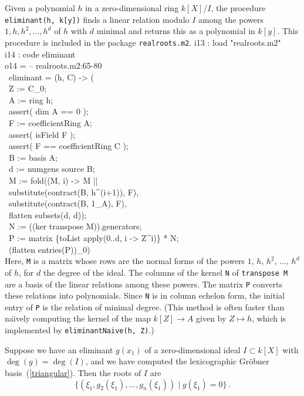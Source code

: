 Given a polynomial $h$ in a zero-dimensional ring $k[X]/I$, the
procedure {\tt eliminant(h, k[y])} finds a linear relation modulo $I$ 
among the powers $1, h, h^2, \ldots, h^d$ of $h$ with $d$ minimal
and returns this as a polynomial in $k[y]$.
This procedure is included in the \Mtwo{}\/ package 
{\tt realroots.m2}.
%
\beginOutput
i13 : load "realroots.m2"\\
\endOutput
%
\beginOutput
i14 : code eliminant\\
\emptyLine
o14 = -- realroots.m2:65-80\\
\      eliminant = (h, C) -> (\\
\           Z := C_0;\\
\           A := ring h;\\
\           assert( dim A == 0 );\\
\           F := coefficientRing A;\\
\           assert( isField F );\\
\           assert( F == coefficientRing C );\\
\           B := basis A;\\
\           d := numgens source B;\\
\           M := fold((M, i) -> M || \\
\                     substitute(contract(B, h^(i+1)), F), \\
\                     substitute(contract(B, 1_A), F), \\
\                     flatten subsets(d, d));\\
\           N := ((ker transpose M)).generators;\\
\           P := matrix \{toList apply(0..d, i -> Z^i)\} * N;\\
\                (flatten entries(P))_0)\\
\endOutput
%
Here, {\tt M} is a matrix whose rows are the normal forms of the
powers  $1$, $h$, $h^2$, $\ldots$, $h^d$ of $h$, for $d$ the degree of the ideal.
The columns of the kernel {\tt N} of {\tt transpose M} are a basis of the
linear relations among these powers. 
The matrix {\tt P} converts these relations into polynomials.
Since {\tt N} is in column echelon form, the initial entry of {\tt P} 
is the relation of minimal degree.
(This method is often faster than na\"\i vely computing the kernel of the
map $k[Z]\to A$ given by $Z\mapsto h$, which is implemented by
{\tt  eliminantNaive(h, Z)}.)

Suppose we have an eliminant $g(x_1)$ of a zero-dimensional 
ideal  $I\subset k[X]$ with $\deg(g)=\deg(I)$, and we have computed the
lexicographic Gr\"obner basis~(\ref{triangular}). 
Then the roots of $I$ are
%
\begin{equation}\label{tri_roots}
   \{ (\xi_1,g_2(\xi_1), \ldots, g_n(\xi_1))\mid g(\xi_1)=0\}\,.
\end{equation}


